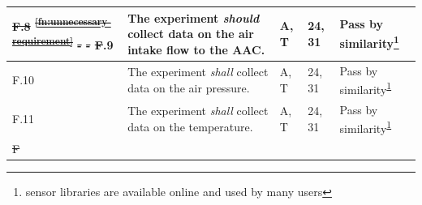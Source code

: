 \documentclass[a4paper,12pt,twoside]{article}
\providecommand{\DIFdeltex}[1]{{\protect\color{red}\sout{#1}}}                      %
\providecommand{\DIFaddbegin}{} %
\providecommand{\DIFdelbegin}{} %
\providecommand{\DIFdelend}{} %
\providecommand{\DIFdel}[1]{\texorpdfstring{\DIFdeltex{#1}}{}} %
\newcommand{\DIFscaledelfig}{0.5}
\newlength{\DIFdelgraphicswidth} %
\newlength{\DIFdelgraphicsheight} %
\newcommand{\DIFaddincludegraphics}[2][]{{\color{blue}\fbox{\DIFOincludegraphics[#1]{#2}}}} %
\newcommand{\DIFdelincludegraphics}[2][]{%
\sbox{\DIFdelgraphicsbox}{\DIFOincludegraphics[#1]{#2}}%
\settoboxwidth{\DIFdelgraphicswidth}{\DIFdelgraphicsbox} %
\settoboxtotalheight{\DIFdelgraphicsheight}{\DIFdelgraphicsbox} %
\scalebox{\DIFscaledelfig}{%
\parbox[b]{\DIFdelgraphicswidth}{\usebox{\DIFdelgraphicsbox}\\[-\baselineskip] \rule{\DIFdelgraphicswidth}{0em}}\llap{\resizebox{\DIFdelgraphicswidth}{\DIFdelgraphicsheight}{%
\setlength{\unitlength}{\DIFdelgraphicswidth}%
\begin{picture}(1,1)%
\thicklines\linethickness{2pt} %
{\color[rgb]{1,0,0}\put(0,0){\framebox(1,1){}}}%
{\color[rgb]{1,0,0}\put(0,0){\line( 1,1){1}}}%
{\color[rgb]{1,0,0}\put(0,1){\line(1,-1){1}}}%
\end{picture}%
}\hspace*{3pt}}} %
} %
\DeclareRobustCommand{\DIFaddbegin}{\DIFOaddbegin \let\includegraphics\DIFaddincludegraphics} %
\DeclareRobustCommand{\DIFdelbegin}{\DIFOdelbegin \let\includegraphics\DIFdelincludegraphics} %
\DeclareRobustCommand{\DIFdelend}{\DIFOaddend \let\includegraphics\DIFOincludegraphics} %
\begin{document}
\begin{longtable}[]{|m{}| m{} |m{} |m{}|m{}|}
\DIFdel{F.8  }%
\DIFdel{\textsuperscript{\ref{fn:unnecessary-requirement}}  }%
\DIFdel{- }%
\DIFdel{-}%
\DIFdel{F}\DIFdelend .9  & The experiment \textit{should} collect data on the air intake flow to the AAC. & A, T & 24, 31 & Pass by similarity\footnote{sensor libraries are available online and used by many users\label{fn:sensor-libraries}}\\ \hline
F.10 & The experiment \textit{shall} collect data on the air pressure. & A, T& 24, 31 & Pass by similarity\textsuperscript{\ref{fn:sensor-libraries}}\\ \hline
F.11 & The experiment \textit{shall} collect data on the temperature. &  A, T& 24, 31 & Pass by similarity\textsuperscript{\ref{fn:sensor-libraries}}\\ \hline
\DIFdelbegin \DIFdel{F}\DIFdelend \DIFaddbegin 




\end{longtable}
\end{document}
